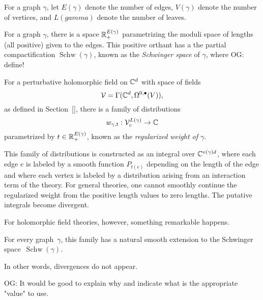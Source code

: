 \documentclass[11pt]{amsart}
\DeclareMathOperator{\Schw}{Schw}
\def\owen#1{{\textcolor{violet!50!black}{OG: {#1}}}}
\begin{document}
For a graph $\gamma$, let $E(\gamma)$ denote the number of edges,
$V(\gamma)$ denote the number of vertices,
and $L(gamma)$ denote the number of leaves.

\begin{dfn}
For a graph $\gamma$, there is a space $\mathbb R_+^{E(\gamma)}$ parametrizing the moduli space of lengths (all positive) given to the edges.
This positive orthant has a the partial compactification $\Schw(\gamma)$, known as the {\em Schwinger space} of $\gamma$, 
where \owen{define!} 
\end{dfn}

\begin{dfn}
For a perturbative holomorphic field on $\mathbb C^d$ with space of fields 
\[
\mathcal V = \Gamma(\mathbb C^d, \Omega^{0,\bullet}(V)),
\] 
as defined in Section~\ref{}, 
there is a family of distributions
\[
w_{\gamma, t}: \mathcal V_c^{L(\gamma)} \to \mathbb C
\]
parametrized by $t \in \mathbb R_+^{E(\gamma)}$,
known as the {\em regularized weight of $\gamma$}.
\end{dfn}

This family of distributions is constructed as an integral over $\mathbb C^{v(\gamma) d}$,
where each edge $e$ is labeled by a smooth function $P_{t(e)}$ depending on the length of the edge and where each vertex is labeled by a distribution arising from an interaction term of the theory.
For general theories, one cannot smoothly continue the regularized weight from the positive length values to zero lengths.
The putative integrals become divergent.

For holomorphic field theories, however, something remarkable happens.

\begin{thm}[Wang, \owen{precise citations}]
For every graph~$\gamma$,
this family has a natural smooth extension to the Schwinger space~$\Schw(\gamma)$.
\end{thm}

In other words, divergences do not appear.

\owen{It would be good to explain why and indicate what is the appropriate "value" to use.}
\end{document}
